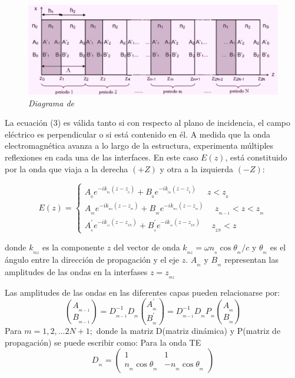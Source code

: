 \documentclass[a4paper,11pt,]{book}
\begin{document}
\begin{figure}[H]
	\centering
	\includegraphics[scale=.45]{../Images/MTT}
	\caption{\emph{Diagrama de} }
	\label{fig:MTT}
\end{figure}

La ecuación (3) es válida tanto si con respecto al plano de incidencia, el campo eléctrico es perpendicular o si está contenido en él. A medida que la onda electromagnética avanza a lo largo de la estructura, experimenta múltiples reflexiones en cada una de las interfaces. En este caso $E(z)$, está constituido por la onda que viaja a la derecha $(+Z)$ y otra a la izquierda $(-Z)$:

\begin{equation}
E(z)= \left\{ \begin{array}{lcl}
A_{_{0}}e^{-ik_{_{0z}}(z-z_{_{0}})}+ B_{_{0}}e^{-ik_{_{0z}}(z-z_{_{0}})}  \ \ \ \ \ \ z<z_{_{0}}  \\
A_{_{m}}e^{-ik_{_{mz}}(z-z_{_{m}})}+ B_{_{m}}e^{-ik_{_{mz}}(z-z_{_{m}})}  \ \ \ \ \ \ z_{_{m-1}}<z<z_{_{m}}  \\

A^{'}_{_{s}}e^{-ik_{_{sz}}(z-z_{_{2N}})}+ B^{'}_{_{s}}e^{-ik_{_{sz}}(z-z_{_{2N}})}  \ \ \ \ \ \ z_{_{2N}}<z

\end{array}
\right.
\end{equation}


donde $k_{_{mz}}$ es la componente $z$ del vector de onda $k_{_{mz}}=\omega n_{_{n}} \cos \theta_{_{m}}/c$ y $ \theta_{_{m}} $ es el ángulo entre la dirección de propagación y el eje $ z $. $A_{_{m}}$ y $B_{_{m}}$ representan las amplitudes de las ondas en la interfases $z=z_{_{mz}}$

Las amplitudes de las ondas en las diferentes capas pueden relacionarse por:
\begin{equation}
{A_{_{m-1}} \choose B_{_{m-1}}} = D^{-1}_{_{m-1}}D_{_{m}}{A^{'}_{_{m}} \choose B^{'}_{_{m}}} = D^{-1}_{_{m-1}}D_{_{m}}P_{_{m}}{A_{_{m}} \choose B_{_{m}}}
\end{equation}
Para $m=1,2,...2N+1;$ donde la matriz D(matriz dinámica) y P(matriz de propagación) se puede escribir como:
Para la onda TE
\begin{equation}
D_{_{m}} = \left( \begin{array}{lcccl}
1 & 1\\

n_{_{m}}\cos \theta_{_{m}} & -n_{_{m}}\cos \theta_{_{m}}

\end{array}
\right)
\end{equation}
\end{document}
